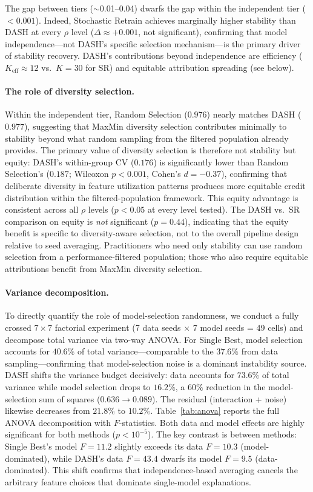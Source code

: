 \documentclass[10pt]{article}
\newcommand{\dash}{\textsc{DASH}}
\newcommand{\rhovar}{\rho}
\begin{document}
The gap between tiers ($\sim$0.01--0.04) dwarfs the gap within the
independent tier ($< 0.001$). Indeed, Stochastic Retrain achieves
marginally higher stability than \dash{} at every $\rhovar$ level
($\Delta \approx +0.001$, not significant), confirming that model
independence---not \dash{}'s specific selection mechanism---is the
primary driver of stability recovery. \dash{}'s contributions beyond
independence are efficiency ($K_{\text{eff}} \approx 12$ vs.\ $K = 30$
for SR) and equitable attribution spreading (see below).

\paragraph{The role of diversity selection.}
Within the independent tier, Random Selection ($0.976$) nearly matches
\dash{} ($0.977$), suggesting that MaxMin diversity selection contributes
minimally to stability beyond what random sampling from the filtered
population already provides. The primary value of diversity selection
is therefore not stability but equity: \dash{}'s within-group CV
($0.176$) is significantly lower than Random Selection's ($0.187$;
Wilcoxon $p < 0.001$, Cohen's $d = -0.37$), confirming that deliberate
diversity in feature utilization patterns produces more equitable credit
distribution within the filtered-population framework. This equity
advantage is consistent across all $\rhovar$ levels ($p < 0.05$ at
every level tested). The \dash{} vs.\ SR comparison on equity is
\emph{not} significant ($p = 0.44$), indicating that the equity benefit
is specific to diversity-aware selection, not to the overall pipeline
design relative to seed averaging. Practitioners who need only stability
can use random selection from a performance-filtered population;
those who also require equitable attributions benefit from MaxMin
diversity selection.

\paragraph{Variance decomposition.}
To directly quantify the role of model-selection randomness, we conduct
a fully crossed $7 \times 7$ factorial experiment (7 data seeds $\times$
7 model seeds = 49 cells) and decompose total variance via two-way
ANOVA. For Single Best, model selection accounts for $40.6\%$ of total
variance---comparable to the $37.6\%$ from data sampling---confirming
that model-selection noise is a dominant instability source. \dash{}
shifts the variance budget decisively: data accounts for $73.6\%$ of
total variance while model selection drops to $16.2\%$, a $60\%$
reduction in the model-selection sum of squares ($0.636 \to 0.089$).
The residual (interaction + noise) likewise decreases from $21.8\%$ to
$10.2\%$. Table~\ref{tab:anova} reports the full ANOVA decomposition
with $F$-statistics. Both data and model effects are highly significant
for both methods ($p < 10^{-5}$). The key contrast is between methods:
Single Best's model $F = 11.2$ slightly exceeds its data $F = 10.3$
(model-dominated), while \dash{}'s data $F = 43.4$ dwarfs its model
$F = 9.5$ (data-dominated). This shift confirms that
independence-based averaging cancels the arbitrary feature choices that
dominate single-model explanations.
\end{document}
